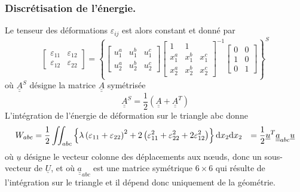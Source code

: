 \subsubsection{Discrétisation de l'énergie.}
Le tenseur des déformations $\varepsilon_{ij}$ est alors constant et donné par
\begin{equation}
    \begin{bmatrix}
        \varepsilon_{11} & \varepsilon_{12} \\
        \varepsilon_{12} & \varepsilon_{22}
    \end{bmatrix}
    =
    \left\{ 
    \begin{bmatrix}
        u_1^a & u_1^b & u_1^c \\
        u_2^a & u_2^b & u_2^c
    \end{bmatrix}
    \begin{bmatrix}
        1 & 1 & \\
        x_1^a & x_1^b & x_1^c \\
        x_2^a & x_2^b & x_2^c
    \end{bmatrix}^{-1}
    \begin{bmatrix}
        0 & 0 \\
        1 & 0 \\
        0 & 1
    \end{bmatrix}
    \right\}^S
    \label{eq:Ch09-076}
\end{equation}
où $\underline{\underline{A}}^S$ désigne la matrice $\underline{\underline{A}}$ symétrisée
\begin{equation}
    \underline{\underline{A}}^S = \frac{1}{2} \left( \underline{\underline{A}} + \underline{\underline{A}}^T \right)
    \label{eq:Ch09-077}
\end{equation}
L'intégration de l'énergie de déformation sur le triangle abc donne
\begin{equation}
    \begin{aligned}
        W_{abc} &= \frac{1}{2} \iint_{abc} \left\{ \lambda \left( \varepsilon_{11} + \varepsilon_{22} \right)^2 + 2 \left( \varepsilon_{11}^2 + \varepsilon_{22}^2 + 2 \varepsilon_{12}^2 \right) \right\} \mathrm{d} x_2 \mathrm{d} x_2
        &= \frac{1}{2} \underline{u}^T \underline{\underline{a}}_{abc} \underline{u}
    \end{aligned}
    \label{eq:Ch09-078}
\end{equation}
où $\underline{u}$ désigne le vecteur colonne des déplacements  aux nœuds, donc un sous-vecteur de $\underline{U}$, et où $\underline{\underline{a}}_{abc}$ est une matrice symétrique $6\times6$ qui résulte de l'intégration sur le triangle et il dépend donc uniquement de la géométrie.

